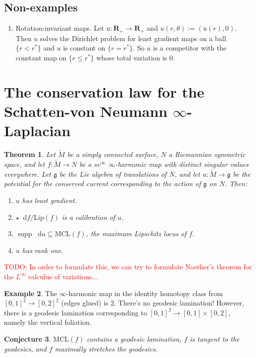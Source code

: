 \documentclass[reqno,11pt]{amsart}
\newcommand{\RR}{\mathbf{R}}
\newcommand*\dif{\mathop{}\!\mathrm{d}}
\DeclareMathOperator{\supp}{supp}
\newcommand{\Lip}{\mathrm{Lip}}
\newcommand{\MCL}{\mathrm{MCL}}
\newtheorem{theorem}{Theorem}[section]
\newtheorem{conjecture}[theorem]{Conjecture}
\theoremstyle{definition}
\newtheorem{example}[theorem]{Example}
\numberwithin{equation}{section}
\newcommand\todo[1]{\textcolor{red}{TODO: #1}}
\begin{document}
\subsection{Non-examples}
\begin{enumerate}
\item Rotation-invariant maps. Let $\overline u: \RR_+ \to \RR_+$ and $u(r, \theta) := (\overline u(r), 0)$.
Then $u$ solves the Dirichlet problem for least gradient maps on a ball $\{r < r^*\}$ and $u$ is constant on $\{r = r^*\}$.
So $u$ is a competitor with the constant map on $\{r \leq r^*\}$ whose total variation is $0$.
\end{enumerate}

\section{The conservation law for the Schatten-von Neumann \texorpdfstring{$\infty$-Laplacian}{infinity-Laplacian}}
\begin{theorem}
Let $\tilde M$ be a simply connected surface, $N$ a Riemannian symmetric space, and let $f: \tilde M \to N$ be a $sv^\infty$ $\infty$-harmonic map with distinct singular values everywhere.
Let $\mathfrak g$ be the Lie algebra of translations of $N$, and let $u: \tilde M \to \mathfrak g$ be the potential for the conserved current corresponding to the action of $\mathfrak g$ on $N$. Then:
\begin{enumerate}
\item $u$ has least gradient.
\item $\star \dif f/\Lip(f)$ is a calibration of $u$.
\item $\supp \dif u \subseteq \MCL(f)$, the maximum Lipschitz locus of $f$.
\item $u$ has rank one.
\end{enumerate}
\end{theorem}

\todo{In order to formulate this, we can try to formulate Noether's theorem for the $L^\infty$ calculus of variations...}

\begin{example}
The $\infty$-harmonic map in the identity homotopy class from $[0, 1]^2 \to [0, 2]^2$ (edges glued) is $2$.
There's no geodesic lamination!
However, there is a geodesic lamination corresponding to $[0, 1]^2 \to [0, 1] \times [0, 2]$, namely the vertical foliation.
\end{example}

\begin{conjecture}
$\MCL(f)$ contains a geodesic lamination, $f$ is tangent to the geodesics, and $f$ maximally stretches the geodesics.
\end{conjecture}
\end{document}
